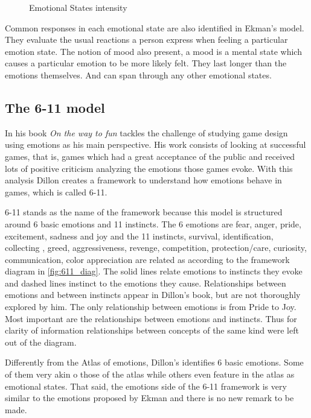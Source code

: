 \begin{figure}[ht]
    \caption{Emotional States intensity}
    \label{fig:emotionalstates}
\end{figure}


Common responses in each emotional state are also identified in Ekman's model. They evaluate the usual reactions a person express when feeling a particular emotion state. The notion of mood also present, a mood is a mental state which causes a particular emotion to be more likely felt. They last longer than the emotions themselves. And can span through any other emotional states.


\FloatBarrier
\subsection{The 6-11 model}

In his book \textit{On the way to fun} \citeauthor{dillon_way_2010} tackles the challenge of studying game design using emotions as his main perspective. His work consists of looking at successful games, that is, games which had a great acceptance of the public and received lots of positive criticism analyzing the emotions those games evoke. With this analysis Dillon creates a framework to understand how emotions behave in games, which is called 6-11.

6-11 stands as the name of the framework because this model is structured around 6 basic emotions and 11 instincts. The 6 emotions are fear, anger, pride, excitement, sadness and joy and the 11 instincts, survival, identification, collecting
, greed, aggressiveness, revenge, competition, protection/care, curiosity, communication, color appreciation are related as according to the framework diagram in \autoref{fig:611_diag}. The solid lines relate emotions to instincts they evoke and dashed lines instinct to the emotions they cause. Relationships between emotions and between instincts appear in Dillon's book, but are not thoroughly explored by him. The only relationship between emotions is from Pride to Joy.  Most important are the relationships between emotions and instincts. Thus for clarity of information relationships between concepts of the same kind were left out of the diagram. 



Differently from the Atlas of emotions, Dillon's identifies 6 basic emotions. Some of them very akin o those of the atlas while others even feature in the atlas as emotional states. That said, the emotions side of the 6-11 framework is very similar to the emotions proposed by Ekman and there is no new remark to be made.


